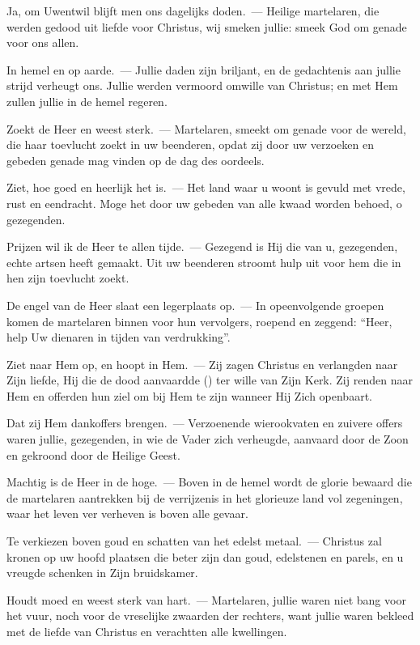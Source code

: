 \documentclass[12pt,twoside,a5paper]{article}
\begin{document}
\begin{halfparskip}
  Ja, om Uwentwil blijft men ons dagelijks doden.~--- Heilige martelaren, die werden gedood uit liefde voor Christus, wij smeken jullie: smeek God om genade voor ons allen.

  In hemel en op aarde.~--- Jullie daden zijn briljant, en de gedachtenis aan jullie strijd verheugt ons. Jullie werden vermoord omwille van Christus; en met Hem zullen jullie in de hemel regeren.

  Zoekt de Heer en weest sterk.~--- Martelaren, smeekt om genade voor de wereld, die haar toevlucht zoekt in uw beenderen, opdat zij door uw verzoeken en gebeden genade mag vinden op de dag des oordeels.

  Ziet, hoe goed en heerlijk het is.~--- Het land waar u woont is gevuld met vrede, rust en eendracht. Moge het door uw gebeden van alle kwaad worden behoed, o gezegenden.

  Prijzen wil ik de Heer te allen tijde.~--- Gezegend is Hij die van u, gezegenden, echte artsen heeft gemaakt. Uit uw beenderen stroomt hulp uit voor hem die in hen zijn toevlucht zoekt.

  De engel van de Heer slaat een legerplaats op.~--- In opeenvolgende groepen komen de martelaren binnen voor hun vervolgers, roepend en zeggend: ``Heer, help Uw dienaren in tijden van verdrukking''.

  Ziet naar Hem op, en hoopt in Hem.~--- Zij zagen Christus en verlangden naar Zijn liefde, Hij die de dood aanvaardde () ter wille van Zijn Kerk. Zij renden naar Hem en offerden hun ziel om bij Hem te zijn wanneer Hij Zich openbaart.

  Dat zij Hem dankoffers brengen.~--- Verzoenende wierookvaten en zuivere offers waren jullie, gezegenden, in wie de Vader zich verheugde, aanvaard door de Zoon en gekroond door de Heilige Geest.

  Machtig is de Heer in de hoge.~--- Boven in de hemel wordt de glorie bewaard die de martelaren aantrekken bij de verrijzenis in het glorieuze land vol zegeningen, waar het leven ver verheven is boven alle gevaar.

  Te verkiezen boven goud en schatten van het edelst metaal.~--- Christus zal kronen op uw hoofd plaatsen die beter zijn dan goud, edelstenen en parels, en u vreugde schenken in Zijn bruidskamer.

  Houdt moed en weest sterk van hart.~--- Martelaren, jullie waren niet bang voor het vuur, noch voor de vreselijke zwaarden der rechters, want jullie waren bekleed met de liefde van Christus en verachtten alle kwellingen.


\end{halfparskip}
\end{document}
